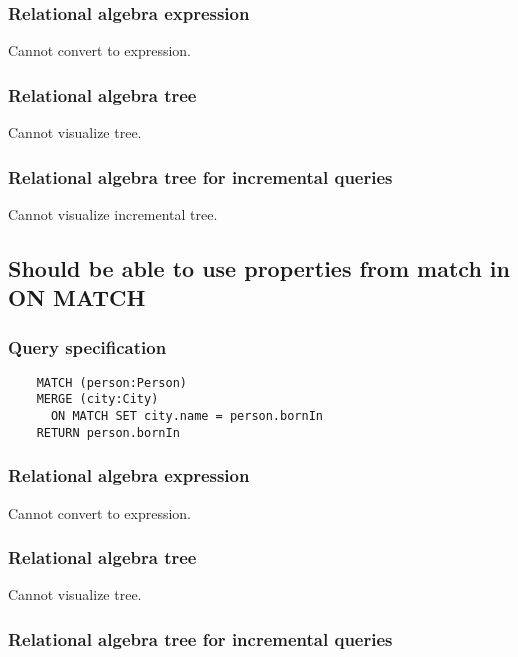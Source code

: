 	\subsubsection*{Relational algebra expression}

	Cannot convert to expression.

	\subsubsection*{Relational algebra tree}

	Cannot visualize tree.

	\subsubsection*{Relational algebra tree for incremental queries}

	Cannot visualize incremental tree.
	\subsection{Should be able to use properties from match in ON MATCH}

	\subsubsection*{Query specification}

	\begin{lstlisting}
	MATCH (person:Person)
	MERGE (city:City)
	  ON MATCH SET city.name = person.bornIn
	RETURN person.bornIn
	\end{lstlisting}


	\subsubsection*{Relational algebra expression}

	Cannot convert to expression.

	\subsubsection*{Relational algebra tree}

	Cannot visualize tree.

	\subsubsection*{Relational algebra tree for incremental queries}


